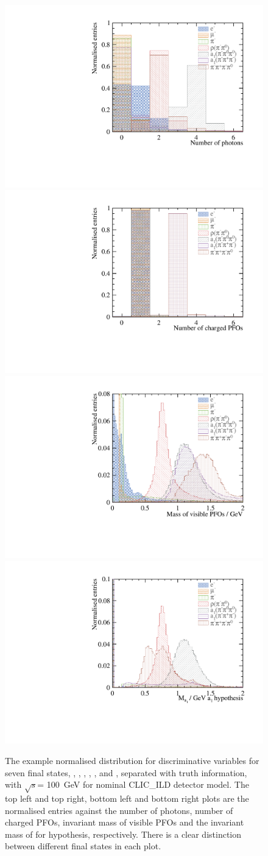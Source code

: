 \documentclass[a4paper,11pt]{article}
\newcommand{\decayElectron}{\Pem\PAGne\PGnGt}
\newcommand{\decayMuon}{\PGmm\PAGnGm\PGnGt}
\newcommand{\decayPion}{\PGpm\PGnGt}
\newcommand{\decayRho}{\PGrP{\PGpm\PGpz}\PGnGt}
\newcommand{\decayAiPhoton}{\PaDoP{\PGpm\PGpz\PGpz}\PGnGt}
\newcommand{\decayAiPion}{\PaDoP{\PGpm\PGpm\PGpp}\PGnGt}
\newcommand{\decayThreePionPhoton}{\PGpm\PGpm\PGpp\PGnGt}
\newcommand{\decayAiPhotonShort}{\PaDoP{\PGpm\PGpz\PGpz}}
\newcommand{\rootS}{\ensuremath{\sqrt{s}}}
\begin{document}
\begin{figure}[htbp]
\centering %

\includegraphics[width=.45\textwidth]{plots/var/nPhoton_100GeV_improved} 
\qquad
\includegraphics[width=.45\textwidth]{plots/var/nCharge_100GeV_improved} 
\qquad
\includegraphics[width=.45\textwidth]{plots/var/mVis_100GeV_improved_zoom}
\qquad
\includegraphics[width=.45\textwidth]{plots/var/mA1A1Fit_100GeV_improved_zoom}
\qquad

\caption{\label{fig:nPfos} 
The example normalised distribution for discriminative variables for seven final states, \decayElectron, \decayMuon, \decayPion, \decayRho, \decayAiPhoton, \decayAiPion and \decayThreePionPhoton, separated with truth information,  with \rootS = 100 \,GeV for nominal CLIC\_ILD detector model. The top left and top right, bottom left and bottom right plots are the normalised entries against the number of photons, number of charged PFOs, invariant mass of visible PFOs and the invariant mass of \decayAiPhotonShort for \decayAiPhotonShort hypothesis, respectively. There is a clear distinction between different final states in each plot.
}
\end{figure}
\end{document}
